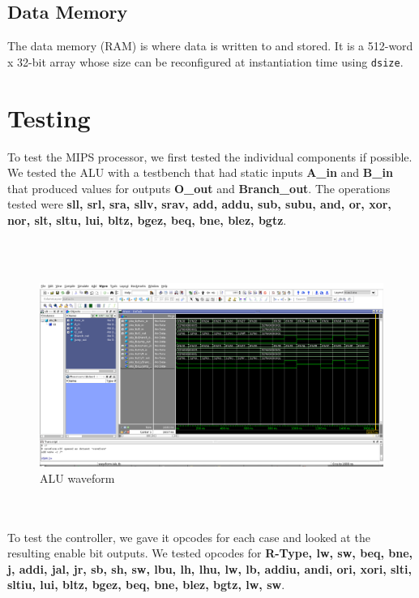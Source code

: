 \documentclass{article}
\begin{document}
	\subsection{Data Memory}
The data memory (RAM) is where data is written to and stored. It is a 512-word x 32-bit array whose size can be reconfigured at instantiation time using \texttt{dsize}.
		
\section{Testing}
To test the MIPS processor, we first tested the individual components if possible. We tested the ALU with a testbench that had static inputs \textbf{A\_in} and \textbf{B\_in} that produced values for outputs \textbf{O\_out} and \textbf{Branch\_out}. The operations tested were \textbf{sll, srl, sra, sllv, srav, add, addu, sub, subu, and, or,  xor, nor, slt, sltu, lui, bltz, bgez, beq, bne, blez, bgtz}. 

\\ \\
\begin{figure}[!ht]
	\centering
		\includegraphics[width=1\textwidth]{ALU_waveform.png}
		\caption{ALU waveform}
\end{figure}
\\ \\

To test the controller, we gave it opcodes for each case and looked at the resulting enable bit outputs. We tested opcodes for \textbf{R-Type, lw, sw, beq, bne, j, addi, jal, jr, sb, sh, sw, lbu, lh, lhu, lw, lb, addiu, andi, ori, xori, slti, sltiu, lui, bltz, bgez, beq, bne, blez, bgtz, lw, sw}.
\end{document}
